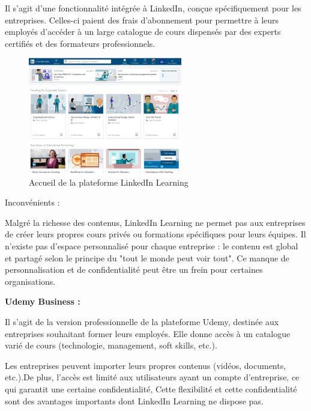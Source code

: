 \documentclass{article}
\begin{document}
Il s’agit d’une fonctionnalité intégrée à LinkedIn, conçue spécifiquement pour les entreprises. Celles-ci paient des frais d’abonnement pour permettre à leurs employés d'accéder à un large catalogue de cours dispensés par des experts certifiés et des formateurs professionnels.

\vspace{0.3cm}

\begin{figure}[h!]
  \centering
  \includegraphics[width=0.6\textwidth]{linkedin-learning.png}
  \caption{ Accueil de la plateforme LinkedIn Learning}
  \label{fig:linkedin-learning}
\end{figure}

\vspace{0.3cm}

\noindent Inconvénients :

\vspace{0.3cm}

Malgré la richesse des contenus, LinkedIn Learning ne permet pas aux entreprises de créer leurs propres cours privés ou formations spécifiques pour leurs équipes. Il n’existe pas d’espace personnalisé pour chaque entreprise : le contenu est global et partagé selon le principe du "tout le monde peut voir tout". Ce manque de personnalisation et de confidentialité peut être un frein pour certaines organisations.

\vspace{1cm}

\noindent \textbf{Udemy Business \cite{Udemy}:}

\vspace{0.3cm}

Il s'agit de la version professionnelle de la plateforme Udemy, destinée aux entreprises souhaitant former leurs employés. Elle donne accès à un catalogue varié de cours (technologie, management, soft skills, etc.).

\noindent Les entreprises peuvent importer leurs propres contenus (vidéos, documents, etc.).De plus, l’accès est limité aux utilisateurs ayant un compte d’entreprise, ce qui garantit une certaine confidentialité, 
Cette flexibilité et cette confidentialité sont des avantages importants dont LinkedIn Learning ne dispose pas.
\end{document}
